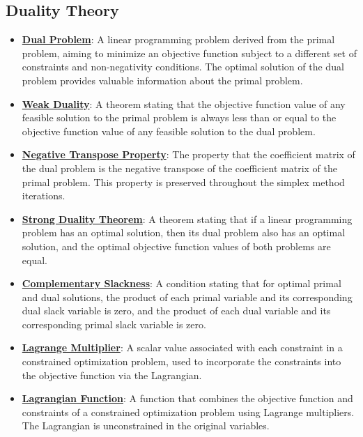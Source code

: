 \documentclass{article}%
\begin{document}
\subsection{Duality Theory}%
\label{subsec:DualityTheory}%
\begin{itemize}[leftmargin=*]%
\item \href{https://www.math.purdue.edu/~yipn/421/2024-09-12-Duality.pdf#page=1}{\textbf{Dual Problem}}: A linear programming problem derived from the primal problem, aiming to minimize an objective function subject to a different set of constraints and non-negativity conditions. The optimal solution of the dual problem provides valuable information about the primal problem.%
\item \href{https://www.math.purdue.edu/~yipn/421/2024-09-12-Duality.pdf#page=2}{\textbf{Weak Duality}}: A theorem stating that the objective function value of any feasible solution to the primal problem is always less than or equal to the objective function value of any feasible solution to the dual problem.%
\item \href{https://www.math.purdue.edu/~yipn/421/2024-09-12-Duality.pdf#page=6}{\textbf{Negative Transpose Property}}: The property that the coefficient matrix of the dual problem is the negative transpose of the coefficient matrix of the primal problem. This property is preserved throughout the simplex method iterations.%
\item \href{https://www.math.purdue.edu/~yipn/421/2024-09-12-Duality.pdf#page=11}{\textbf{Strong Duality Theorem}}: A theorem stating that if a linear programming problem has an optimal solution, then its dual problem also has an optimal solution, and the optimal objective function values of both problems are equal.%
\item \href{https://www.math.purdue.edu/~yipn/421/2024-09-12-Duality.pdf#page=5}{\textbf{Complementary Slackness}}: A condition stating that for optimal primal and dual solutions, the product of each primal variable and its corresponding dual slack variable is zero, and the product of each dual variable and its corresponding primal slack variable is zero.%
\item \href{https://www.math.purdue.edu/~yipn/421/2024-09-17-DualityGeneral.pdf#page=2}{\textbf{Lagrange Multiplier}}: A scalar value associated with each constraint in a constrained optimization problem, used to incorporate the constraints into the objective function via the Lagrangian.%
\item \href{https://www.math.purdue.edu/~yipn/421/2024-09-17-DualityGeneral.pdf#page=2}{\textbf{Lagrangian Function}}: A function that combines the objective function and constraints of a constrained optimization problem using Lagrange multipliers. The Lagrangian is unconstrained in the original variables.%

\end{itemize}
\end{document}
